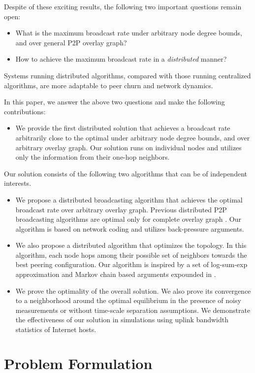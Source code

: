 \documentclass[10pt,conference]{IEEEtran}
\begin{document}
Despite of these exciting results, the following two important questions
remain open:
\begin{itemize}
\item What is the maximum broadcast rate under arbitrary node degree bounds,
and over general P2P overlay graph?
\item How to achieve the maximum broadcast rate in a \emph{distributed}
manner?
\end{itemize}
Systems running distributed algorithms, compared with those running
centralized algorithms, are more adaptable to peer churn and network
dynamics.

In this paper, we answer the above two questions and make the following
contributions:
\begin{itemize}
\item We provide the first distributed solution that achieves a broadcast
rate arbitrarily close to the optimal under arbitrary node degree
bounds, and over arbitrary overlay graph. Our solution runs on individual
nodes and utilizes only the information from their one-hop neighbors.
\end{itemize}
Our solution consists of the following two algorithms that can be
of independent interests.
\begin{itemize}
\item We propose a distributed broadcasting algorithm that achieves the
optimal broadcast rate over arbitrary overlay graph. Previous distributed
P2P broadcasting algorithms are optimal only for complete overlay
graph \cite{massoulie2007rdb,all:Mutualcast:LPZ05,all:P2PStreaming:KLR.07}.
Our algorithm is based on network coding and utilizes back-pressure
arguments.
\item We also propose a distributed algorithm that optimizes the topology.
In this algorithm, each node hops among their possible set of neighbors
towards the best peering configuration. Our algorithm is inspired
by a set of log-sum-exp approximation and Markov chain based arguments
expounded in \cite{MA:CLSC10}.
\item We prove the optimality of the overall solution. We also prove its
convergence to a neighborhood around the optimal equilibrium in the presence of
noisy measurements or without time-scale separation assumptions. We
demonstrate the effectiveness of our solution in simulations using
uplink bandwidth statistics of Internet hosts.
\end{itemize}


\section{Problem Formulation}
\end{document}
